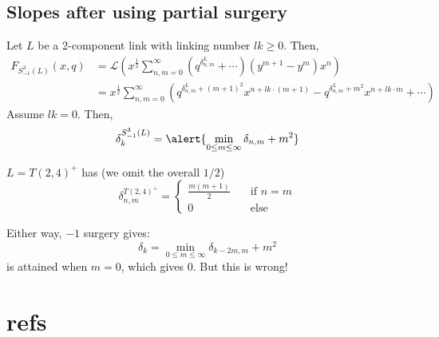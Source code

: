 \documentclass[11pt,e-only]{amsart}
\begin{document}
\subsection{Slopes after using partial surgery}


Let $L$ be a 2-component link with linking number $lk\geq 0$. Then,
\begin{equation}
\begin{split}
    F_{S^3_{-1}(L)}(x,q)&=\mathcal{L}\left(x^\frac12 \sum_{n,m=0}^\infty \left(q^{\delta_{n,m}^L}+\cdots\right) (y^{m+1}-y^m) x^n \right)
    \\&=x^{\frac12}\sum_{n,m=0}^\infty \left(q^{\delta_{n,m}^L+(m+1)^2}x^{n+lk\cdot (m+1)}-q^{\delta_{n,m}^L+m^2}x^{n+lk\cdot m}+\cdots\right) %
\end{split}
\end{equation}
Assume $lk=0$. Then,
\begin{equation}
    \delta_k^{S^3_{-1}(L)} = \alert{\min_{0\leq m \leq \infty} \delta_{n,m}+m^2}
\end{equation}

\begin{example} $L=T(2,4)^+$ has (we omit the overall $1/2$)
\begin{equation}
    \delta^{T(2,4)^+}_{n,m} = \begin{cases}
        \frac{m(m+1)}{2} \quad &\text{if }n=m \\
        0 \quad &\text{else}
    \end{cases}
\end{equation}

Either way, $-1$ surgery gives:
\begin{equation}
    \delta_k = \min_{0\leq m \leq \infty} \delta_{k-2m,m}+m^2
\end{equation}
is attained when $m=0$, which gives $0$. \alert{But this is wrong!}


    
\end{example}

\section{refs}
\end{document}
